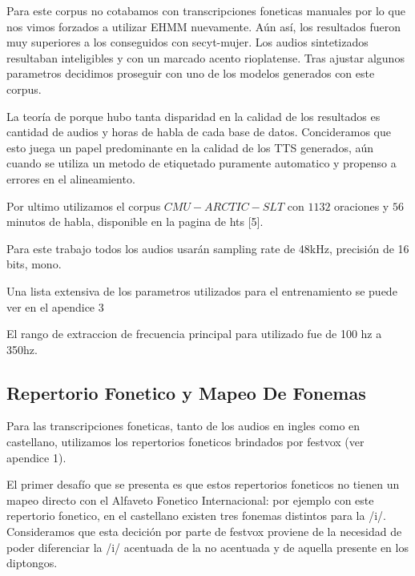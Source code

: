 Para este corpus no cotabamos con transcripciones foneticas manuales por lo que nos vimos forzados a utilizar EHMM nuevamente. Aún así, los resultados fueron muy superiores a los conseguidos con secyt-mujer. Los audios sintetizados resultaban inteligibles y con un marcado acento rioplatense. Tras ajustar algunos parametros decidimos proseguir con uno de los modelos generados con este corpus.

La teoría de porque hubo tanta disparidad en la calidad de los resultados es cantidad de audios y horas de habla de cada base de datos. Concideramos que esto juega un papel predominante en la calidad de los TTS generados, aún cuando se utiliza un metodo de etiquetado puramente automatico y propenso a errores en el alineamiento.

Por ultimo utilizamos el corpus $CMU-ARCTIC-SLT$ con $1132$ oraciones y $56$ minutos de habla, disponible en la pagina de hts [5].

Para este trabajo todos los audios usarán sampling rate de 48kHz, precisión de 16 bits, mono.

Una lista extensiva de los parametros utilizados para el entrenamiento se puede ver en el apendice 3

El rango de extraccion de frecuencia principal para  utilizado fue de 100 hz a 350hz.


\subsection{Repertorio Fonetico y Mapeo De Fonemas}


Para las transcripciones foneticas, tanto de los audios en ingles como en castellano, utilizamos los repertorios foneticos brindados por festvox (ver apendice 1).

El primer desafío que se presenta es que estos repertorios foneticos no tienen un mapeo directo con el Alfaveto Fonetico Internacional: por ejemplo con este repertorio fonetico, en el castellano existen tres fonemas distintos para la /i/. Consideramos que esta decición por parte de festvox proviene de la necesidad de poder diferenciar la /i/ acentuada de la no acentuada y de aquella presente en los diptongos. 

